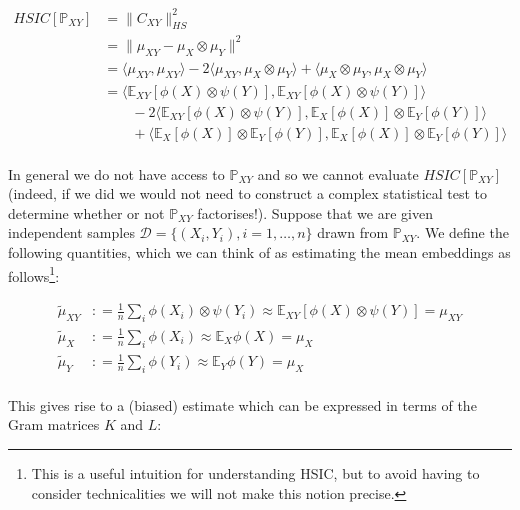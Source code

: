 \documentclass[12pt]{article}
\numberwithin{claim}{section}
\numberwithin{lemma}{section}
\numberwithin{theorem}{section}
\begin{document}
\begin{align*}
HSIC[\mathbb{P}_{XY}] &= \|C_{XY}\|_{HS}^2\\
&= \|\mu_{XY} - \mu_X\otimes \mu_Y\|^2 \\
& = \langle \mu_{XY} , \mu_{XY} \rangle - 2\langle \mu_{XY} , \mu_X\otimes \mu_Y\rangle + \langle\mu_X\otimes \mu_Y ,\mu_X\otimes \mu_Y \rangle \\
& = \langle \mathbb{E}_{XY}[\phi(X)\otimes\psi(Y)] , \mathbb{E}_{XY}[\phi(X)\otimes\psi(Y)] \rangle \\
& \quad \quad - 2\langle\mathbb{E}_{XY}[\phi(X)\otimes\psi(Y)] , \mathbb{E}_{X}[\phi(X)]\otimes\mathbb{E}_{Y}[\phi(Y)]\rangle  \\
& \quad \quad + \langle \mathbb{E}_{X}[\phi(X)]\otimes\mathbb{E}_{Y}[\phi(Y)] ,\mathbb{E}_{X}[\phi(X)]\otimes\mathbb{E}_{Y}[\phi(Y)] \rangle \\
\end{align*}

In general we do not have access to $\mathbb{P}_{XY}$ and so we cannot evaluate $HSIC[\mathbb{P}_{XY}]$ (indeed, if we did we would not need to construct a complex statistical test to determine whether or not $\mathbb{P}_{XY}$ factorises!). Suppose that we are given independent samples $\mathcal{D} = \{(X_i,Y_i), i=1,\ldots,n\}$ drawn from $\mathbb{P}_{XY}$. We define the following quantities, which we can think of as estimating the mean embeddings as follows\footnote{This is a useful intuition for understanding HSIC, but to avoid having to consider technicalities we will not make this notion precise.}:

\begin{align*}
\tilde{\mu}_{XY}&: = \frac{1}{n} \sum_i \phi(X_i)\otimes\psi(Y_i)  \approx  \mathbb{E}_{XY}[\phi(X)\otimes\psi(Y)] = \mu_{XY}  \\
\tilde{\mu}_{X}&: = \frac{1}{n} \sum_i \phi(X_i)  \approx  \mathbb{E}_{X}\phi(X) = \mu_{X}  \\
\tilde{\mu}_{Y}&: = \frac{1}{n} \sum_i \phi(Y_i)  \approx  \mathbb{E}_{Y}\phi(Y) = \mu_{X}  \\
\end{align*}

This gives rise to a (biased) estimate which can be expressed in terms of the Gram matrices $K$ and $L$:
\end{document}
